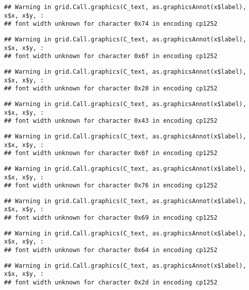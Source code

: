 \documentclass[
]{article}
\begin{document}
\begin{verbatim}
## Warning in grid.Call.graphics(C_text, as.graphicsAnnot(x$label), x$x, x$y, :
## font width unknown for character 0x74 in encoding cp1252
\end{verbatim}

\begin{verbatim}
## Warning in grid.Call.graphics(C_text, as.graphicsAnnot(x$label), x$x, x$y, :
## font width unknown for character 0x6f in encoding cp1252
\end{verbatim}

\begin{verbatim}
## Warning in grid.Call.graphics(C_text, as.graphicsAnnot(x$label), x$x, x$y, :
## font width unknown for character 0x20 in encoding cp1252
\end{verbatim}

\begin{verbatim}
## Warning in grid.Call.graphics(C_text, as.graphicsAnnot(x$label), x$x, x$y, :
## font width unknown for character 0x43 in encoding cp1252
\end{verbatim}

\begin{verbatim}
## Warning in grid.Call.graphics(C_text, as.graphicsAnnot(x$label), x$x, x$y, :
## font width unknown for character 0x6f in encoding cp1252
\end{verbatim}

\begin{verbatim}
## Warning in grid.Call.graphics(C_text, as.graphicsAnnot(x$label), x$x, x$y, :
## font width unknown for character 0x76 in encoding cp1252
\end{verbatim}

\begin{verbatim}
## Warning in grid.Call.graphics(C_text, as.graphicsAnnot(x$label), x$x, x$y, :
## font width unknown for character 0x69 in encoding cp1252
\end{verbatim}

\begin{verbatim}
## Warning in grid.Call.graphics(C_text, as.graphicsAnnot(x$label), x$x, x$y, :
## font width unknown for character 0x64 in encoding cp1252
\end{verbatim}

\begin{verbatim}
## Warning in grid.Call.graphics(C_text, as.graphicsAnnot(x$label), x$x, x$y, :
## font width unknown for character 0x2d in encoding cp1252
\end{verbatim}
\end{document}
